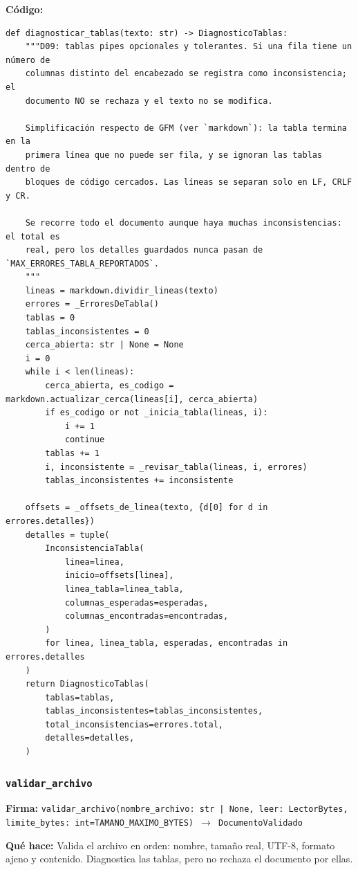 \documentclass[11pt,a4paper]{article}
\begin{document}
\textbf{Código:}
\begin{lstlisting}
def diagnosticar_tablas(texto: str) -> DiagnosticoTablas:
    """D09: tablas pipes opcionales y tolerantes. Si una fila tiene un número de
    columnas distinto del encabezado se registra como inconsistencia; el
    documento NO se rechaza y el texto no se modifica.

    Simplificación respecto de GFM (ver `markdown`): la tabla termina en la
    primera línea que no puede ser fila, y se ignoran las tablas dentro de
    bloques de código cercados. Las líneas se separan solo en LF, CRLF y CR.

    Se recorre todo el documento aunque haya muchas inconsistencias: el total es
    real, pero los detalles guardados nunca pasan de `MAX_ERRORES_TABLA_REPORTADOS`.
    """
    lineas = markdown.dividir_lineas(texto)
    errores = _ErroresDeTabla()
    tablas = 0
    tablas_inconsistentes = 0
    cerca_abierta: str | None = None
    i = 0
    while i < len(lineas):
        cerca_abierta, es_codigo = markdown.actualizar_cerca(lineas[i], cerca_abierta)
        if es_codigo or not _inicia_tabla(lineas, i):
            i += 1
            continue
        tablas += 1
        i, inconsistente = _revisar_tabla(lineas, i, errores)
        tablas_inconsistentes += inconsistente

    offsets = _offsets_de_linea(texto, {d[0] for d in errores.detalles})
    detalles = tuple(
        InconsistenciaTabla(
            linea=linea,
            inicio=offsets[linea],
            linea_tabla=linea_tabla,
            columnas_esperadas=esperadas,
            columnas_encontradas=encontradas,
        )
        for linea, linea_tabla, esperadas, encontradas in errores.detalles
    )
    return DiagnosticoTablas(
        tablas=tablas,
        tablas_inconsistentes=tablas_inconsistentes,
        total_inconsistencias=errores.total,
        detalles=detalles,
    )
\end{lstlisting}

\subsubsection*{\texttt{validar\_archivo}}
\textbf{Firma:} \texttt{validar\_archivo(nombre\_archivo: str | None, leer: LectorBytes, limite\_bytes: int=TAMANO\_MAXIMO\_BYTES) $\rightarrow$ DocumentoValidado}

\textbf{Qué hace:} Valida el archivo en orden: nombre, tamaño real, UTF-8, formato ajeno y
contenido. Diagnostica las tablas, pero no rechaza el documento por ellas.
\end{document}
